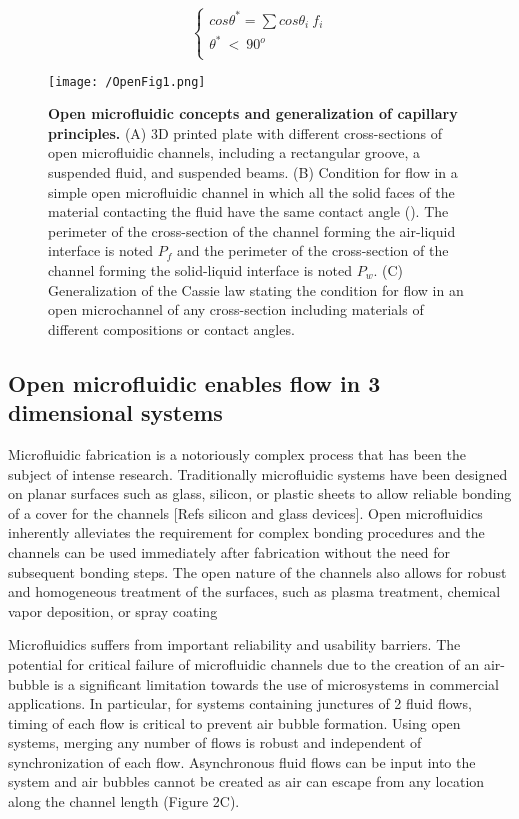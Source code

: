 \begin{equation}
    \left\{
\begin{array}{ll}
cos \theta^{*} =  \sum cos\theta_{i} \ f_{i}\\
\theta^{*} \ < \ 90^{o}\\
\end{array}
\right.
\end{equation}

\begin{figure}[h!] %
\centering
\texttt{[image: /OpenFig1.png]}
\caption[\textbf{Open microfluidic concepts and generalization of capillary principles}]{\textbf{Open microfluidic concepts and generalization of capillary principles.} (A) 3D printed plate with different cross-sections of open microfluidic channels, including a rectangular groove, a suspended fluid, and suspended beams. (B) Condition for flow in a simple open microfluidic channel in which all the solid faces of the material contacting the fluid have the same contact angle (\texttheta). The perimeter of the cross-section of the channel forming the air-liquid interface is noted $P_f$ and the perimeter of the cross-section of the channel forming the solid-liquid interface is noted $P_w$. (C) Generalization of the Cassie law stating the condition for flow in an open microchannel of any cross-section including materials of different compositions or contact angles.}
\label{figure:OpenFig1}
\end{figure}


\subsection{Open microfluidic enables flow in 3 dimensional systems}
Microfluidic fabrication is a notoriously complex process that has been the subject of intense research. Traditionally microfluidic systems have been designed on planar surfaces such as glass, silicon, or plastic sheets to allow reliable bonding of a cover for the channels [Refs silicon and glass devices]. Open microfluidics inherently alleviates the requirement for complex bonding procedures and the channels can be used immediately after fabrication without the need for subsequent bonding steps. The open nature of the channels also allows for robust and homogeneous treatment of the surfaces, such as plasma treatment, chemical vapor deposition, or spray coating \cite{Casavant2013, Hong2012}

Microfluidics suffers from important reliability and usability barriers. The potential for critical failure of microfluidic channels due to the creation of an air-bubble is a significant limitation towards the use of microsystems in commercial applications. In particular, for systems containing junctures of 2 fluid flows, timing of each flow is critical to prevent air bubble formation. Using open systems, merging any number of flows is robust and independent of synchronization of each flow. Asynchronous fluid flows can be input into the system and air bubbles cannot be created as air can escape from any location along the channel length (Figure 2C). 

